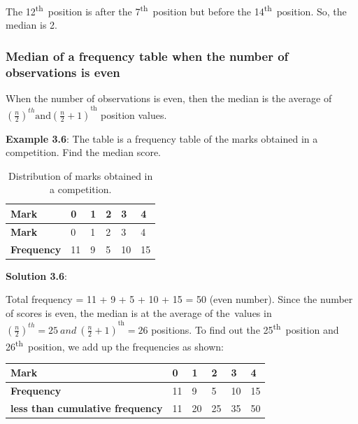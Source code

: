\documentclass[
]{book}
\begin{document}
The 12\textsuperscript{th}~position is after the 7\textsuperscript{th}~position but before the
14\textsuperscript{th}~position. So, the median is 2.

\hypertarget{median-of-a-frequency-table-when-the-number-of-observations-is-even}{%
\subsubsection{Median of a frequency table when the number of observations is even}\label{median-of-a-frequency-table-when-the-number-of-observations-is-even}}

When the number of observations is even, then the median is the average
of
\({\left( \frac{n}{2} \right)^{th}\text{and}\left( \frac{n}{2} + 1 \right)}^{\text{th}}\)
position values.

\textbf{Example 3.6}: The table is a frequency table of the marks obtained in
a competition. Find the median score.

\begin{longtable}[]{@{}llllll@{}}
\caption{\label{tab:median} Distribution of marks obtained in a competition.}\tabularnewline
\toprule\noalign{}
\textbf{Mark} & 0 & 1 & 2 & 3 & 4 \\
\midrule\noalign{}
\endfirsthead
\toprule\noalign{}
\textbf{Mark} & 0 & 1 & 2 & 3 & 4 \\
\midrule\noalign{}
\endhead
\bottomrule\noalign{}
\endlastfoot
\textbf{Frequency} & 11 & 9 & 5 & 10 & 15 \\
\end{longtable}

\textbf{Solution 3.6}:

Total frequency = 11 + 9 + 5 + 10 + 15 = 50 (even number). Since the
number of scores is even, the median is at the average of the~values in
\({\left( \frac{n}{2} \right)^{th} = 25\ and\ \left( \frac{n}{2} + 1 \right)}^{\text{th}} = 26\)
positions. To find out the 25\textsuperscript{th}~position and 26\textsuperscript{th}~position, we add
up the frequencies as shown:

\begin{longtable}[]{@{}llllll@{}}
\toprule\noalign{}
\textbf{Mark} & 0 & 1 & 2 & 3 & 4 \\
\midrule\noalign{}
\endhead
\bottomrule\noalign{}
\endlastfoot
\textbf{Frequency} & 11 & 9 & 5 & 10 & 15 \\
\textbf{less than cumulative frequency} & 11 & 20 & 25 & 35 & 50 \\
\end{longtable}
\end{document}

